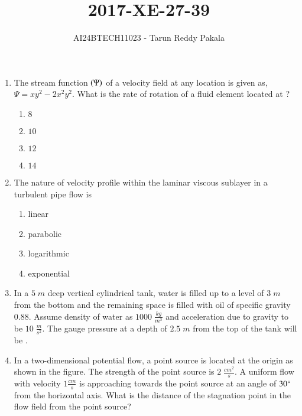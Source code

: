 \documentclass[journal,12pt,onecolumn]{IEEEtran}
\title{2017-XE-27-39}
\author{AI24BTECH11023 - Tarun Reddy Pakala}
\theoremstyle{remark}
\begin{document}


\maketitle
\bigskip
\renewcommand{\thefigure}{\theenumi}
\renewcommand{\thetable}{\theenumi}
\begin{enumerate}[start=27]
\item The stream function $\left(\Psi\right)$ of a velocity field at any location  is given as, $\Psi=xy^2-2x^2y^2$. What is the rate of rotation of a fluid element located at ?
\begin{enumerate}
    \item $8$
    \item $10$
    \item $12$
    \item $14$
\end{enumerate}
\item The nature of velocity profile within the laminar viscous sublayer in a turbulent pipe flow is
\begin{enumerate}
    \item linear 
    \item parabolic
    \item logarithmic
    \item exponential
\end{enumerate}
\item In a $5\;m$ deep vertical cylindrical tank, water is filled up to a level of $3\;m$ from the bottom and the remaining space is filled with oil of specific gravity $0.88$. Assume density of water as $1000\;\frac{kg}{m^3}$ and acceleration due to gravity to be $10\;\frac{m}{s^2}$. The gauge pressure  at a depth of $2.5\;m$ from the top of the tank will be \underline{\hspace{2cm}}.
\item In a two-dimensional potential flow, a point source is located at the origin  as shown in the figure. The strength of the point source is $2\;\frac{cm^2}{s}$. A uniform flow with velocity $1\frac{cm}{s}$ is approaching towards the point source at an angle of $30\degree$ from the horizontal axis. What is the distance  of the stagnation point in the flow field from the point source?
\begin{figure}[!ht]
\centering
\resizebox{3cm}{3cm}{%
\begin{circuitikz}

\end{circuitikz}}
\end{figure}
\end{enumerate}
\end{document}
